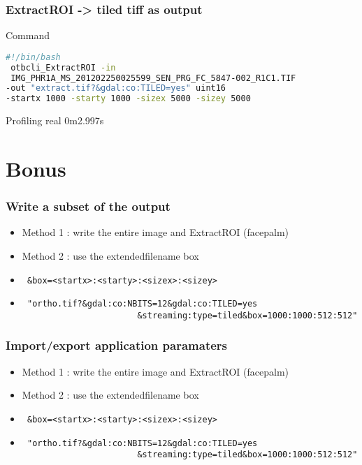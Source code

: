 \documentclass[8pt]{beamer}
\begin{document}
\begin{frame}[fragile]
\frametitle{ExtractROI -> tiled tiff as output}

\begin{block}{Command}
\begin{lstlisting}[language=bash]
#!/bin/bash
 otbcli_ExtractROI -in
 IMG_PHR1A_MS_201202250025599_SEN_PRG_FC_5847-002_R1C1.TIF 
-out "extract.tif?&gdal:co:TILED=yes" uint16 
-startx 1000 -starty 1000 -sizex 5000 -sizey 5000
\end{lstlisting}
\end{block}

\begin{block}{Profiling}
real	0m2.997s
\end{block}

\end{frame}

\section{Bonus}
\begin{frame}[fragile]
\frametitle{Write a subset of the output}
\begin{itemize}
\item Method 1 : write the entire image and ExtractROI (facepalm)
\item Method 2 : use the extendedfilename box
\item \begin{verbatim} &box=<startx>:<starty>:<sizex>:<sizey> \end{verbatim}
\item \begin{verbatim} "ortho.tif?&gdal:co:NBITS=12&gdal:co:TILED=yes
                       &streaming:type=tiled&box=1000:1000:512:512" \end{verbatim}
\end{itemize}
\end{frame}

\begin{frame}[fragile]
\frametitle{Import/export application paramaters}
\begin{itemize}
\item Method 1 : write the entire image and ExtractROI (facepalm)
\item Method 2 : use the extendedfilename box
\item \begin{verbatim} &box=<startx>:<starty>:<sizex>:<sizey> \end{verbatim}
\item \begin{verbatim} "ortho.tif?&gdal:co:NBITS=12&gdal:co:TILED=yes
                       &streaming:type=tiled&box=1000:1000:512:512" \end{verbatim}
\end{itemize}
\end{frame}
\end{document}
